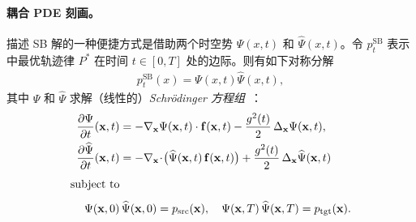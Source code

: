\paragraph{耦合 PDE 刻画。}  
描述 SB 解的一种便捷方式是借助两个时空势 $\Psi(x,t)$ 和 $\widehat{\Psi}(x,t)$。令
$p_t^{\mathrm{SB}}$ 表示  中最优轨迹律 $P^*$ 在时间 $t\in[0,T]$ 处的边际。则有如下对称分解~\citep{dai1991stochastic}
\begin{align}\label{eq:sb-symmetry}
p_t^{\mathrm{SB}}(x) = \Psi(x,t) \widehat{\Psi}(x,t),
\end{align}
其中 $\Psi$ 和 $\widehat{\Psi}$ 求解（线性的）\emph{Schrödinger 方程组}~\citep{caluya2021wasserstein,chen2021stochastic,chenlikelihood}：
\begin{align}
\begin{aligned}\label{eq:pde-schrodinger}
\frac{\partial \Psi}{\partial t}(\mathbf{x},t)
  &= -\nabla_{\mathbf{x}} \Psi(\mathbf{x},t) \cdot {\mathbf{f}}(\mathbf{x},t)
     - \frac{g^2(t)}{2}\,\Delta_\mathbf{x} \Psi(\mathbf{x},t),  \\
\frac{\partial \widehat{\Psi}}{\partial t}(\mathbf{x},t)
  &= -\nabla_{\mathbf{x}}\!\cdot\!\bigl(\widehat{\Psi}(\mathbf{x},t)\,{\mathbf{f}}(\mathbf{x},t)\bigr)
     + \frac{g^2(t)}{2}\,\Delta_\mathbf{x}\widehat{\Psi}(\mathbf{x},t) 
\\[4pt] \text{subject to}  \\[4pt]
\Psi(\mathbf{x},0)&\,\widehat{\Psi}(\mathbf{x},0) = p_{\mathrm{src}}(\mathbf{x}),
\quad
\Psi(\mathbf{x},T)\,\widehat{\Psi}(\mathbf{x},T) = p_{\mathrm{tgt}}(\mathbf{x}). 
\end{aligned}
\end{align}

